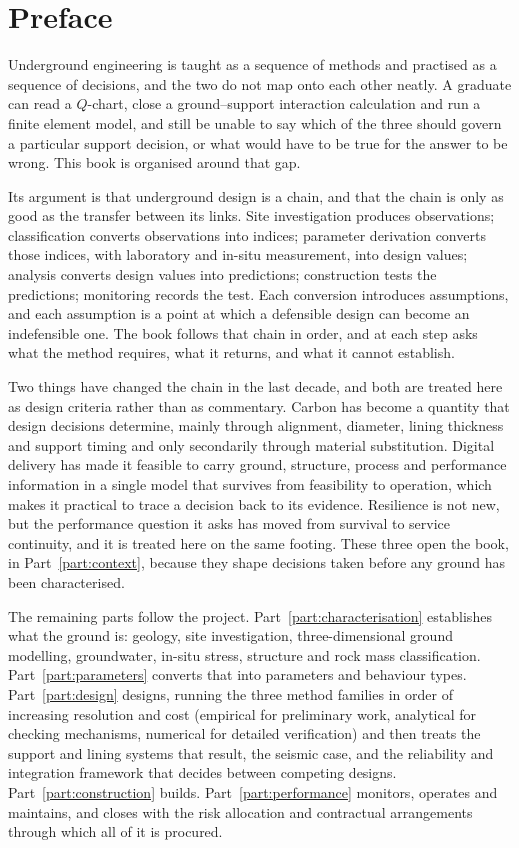\chapter*{Preface}
{}
\label{ch:preface}

Underground engineering is taught as a sequence of methods and practised as a
sequence of decisions, and the two do not map onto each other neatly. A
graduate can read a $Q$-chart, close a ground--support interaction calculation
and run a finite element model, and still be unable to say which of the three should govern a
particular support decision, or what would have to be true for the answer to
be wrong. This book is organised around that gap.

Its argument is that underground design is a chain, and that the chain is only
as good as the transfer between its links. Site investigation produces
observations; classification converts observations into indices; parameter
derivation converts those indices, with laboratory and in-situ measurement,
into design values; analysis converts design values into predictions; construction tests the predictions; monitoring records the test.
Each conversion introduces assumptions, and each assumption is a point at which a
defensible design can become an indefensible one. The book follows
that chain in order, and at each step asks what the method requires, what it
returns, and what it cannot establish.

Two things have changed the chain in the last decade, and both are treated
here as design criteria rather than as commentary. Carbon has become a
quantity that design decisions determine, mainly through alignment, diameter,
lining thickness and support timing and only secondarily through material
substitution. Digital delivery has made it feasible to carry ground,
structure, process and performance information in a single model that survives
from feasibility to operation, which makes it practical to trace a
decision back to its evidence. Resilience
is not new, but the performance question it asks has moved from survival to
service continuity, and it is treated here on the same footing. These three
open the book, in Part~\ref{part:context},
because they shape decisions taken before any ground has been characterised.

The remaining parts follow the project. Part~\ref{part:characterisation}
establishes what the ground is: geology, site investigation,
three-dimensional ground modelling, groundwater, in-situ stress, structure and
rock mass classification. Part~\ref{part:parameters} converts that into
parameters and behaviour types. Part~\ref{part:design} designs, running the
three method families in order of increasing resolution and cost (empirical
for preliminary work, analytical for checking mechanisms, numerical for
detailed verification) and then treats the support and lining systems that
result, the seismic case, and the reliability and integration framework that
decides between competing designs.
Part~\ref{part:construction} builds. Part~\ref{part:performance} monitors,
operates and maintains, and closes with the risk allocation and contractual
arrangements through which all of it is procured.

